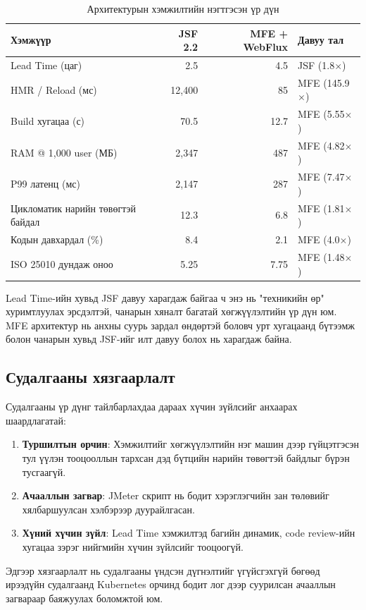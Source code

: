 \begin{table}[H]
    \centering
    \caption{Архитектурын хэмжилтийн нэгтгэсэн үр дүн}
    \label{tab:summary_results}
    \renewcommand{\arraystretch}{0.7}
    \begin{tabular}{lrrl}
        \toprule
        \textbf{Хэмжүүр} & \textbf{JSF 2.2} & \textbf{MFE + WebFlux} & \textbf{Давуу тал} \\
        \midrule
        Lead Time (цаг)        & 2.5     & 4.5     & JSF (1.8$\times$) \\
        HMR / Reload (мс)      & 12,400  & 85      & MFE (145.9$\times$) \\
        Build хугацаа (с)      & 70.5    & 12.7    & MFE (5.55$\times$) \\
        RAM @ 1,000 user (МБ)  & 2,347   & 487     & MFE (4.82$\times$) \\
        P99 латенц (мс)        & 2,147   & 287     & MFE (7.47$\times$) \\
        Цикломатик нарийн төвөгтэй байдал & 12.3 & 6.8 & MFE (1.81$\times$) \\
        Кодын давхардал (\%)   & 8.4     & 2.1     & MFE (4.0$\times$) \\
        ISO 25010 дундаж оноо  & 5.25    & 7.75    & MFE (1.48$\times$) \\
        \bottomrule
    \end{tabular}
\end{table}

Lead Time-ийн хувьд JSF давуу харагдаж байгаа ч энэ нь "техникийн өр" хуримтлуулах эрсдэлтэй, чанарын хяналт багатай хөгжүүлэлтийн үр дүн юм. MFE архитектур нь анхны суурь зардал өндөртэй боловч урт хугацаанд бүтээмж болон чанарын хувьд JSF-ийг илт давуу болох нь харагдаж байна.

\subsection{Судалгааны хязгаарлалт}

Судалгааны үр дүнг тайлбарлахдаа дараах хүчин зүйлсийг анхаарах шаардлагатай:
\begin{enumerate}
  \item \textbf{Туршилтын орчин}: Хэмжилтийг хөгжүүлэлтийн нэг машин дээр гүйцэтгэсэн тул үүлэн тооцооллын тархсан дэд бүтцийн нарийн төвөгтэй байдлыг бүрэн тусгаагүй.
  \item \textbf{Ачааллын загвар}: JMeter скрипт нь бодит хэрэглэгчийн зан төлөвийг хялбаршуулсан хэлбэрээр дуурайлгасан.
  \item \textbf{Хүний хүчин зүйл}: Lead Time хэмжилтэд багийн динамик, code review-ийн хугацаа зэрэг нийгмийн хүчин зүйлсийг тооцоогүй.
\end{enumerate}

Эдгээр хязгаарлалт нь судалгааны үндсэн дүгнэлтийг үгүйсгэхгүй бөгөөд ирээдүйн судалгаанд Kubernetes орчинд бодит лог дээр суурилсан ачааллын загвараар баяжуулах боломжтой юм.